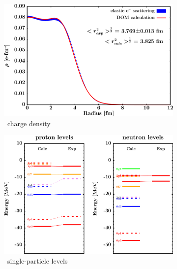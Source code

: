 \begin{figure}[hbtp]
    \captionsetup[subfigure]{labelformat=empty}
    \centering
    \begin{subfigure}[b]{0.45\textwidth}
        \centering
        \includegraphics[width=\linewidth]{figures/ni58_chargeDensity.png}
        \caption{\niEight\ charge density}
        \label{DOMFitData_ni58_chargeDensity}
    \end{subfigure}\hspace{6pt}
    \begin{subfigure}[b]{0.45\textwidth}
        \centering
        \includegraphics[width=\linewidth]{figures/ni58_SPLevels.png}
        \caption{\niEight\ single-particle levels}
        \label{DOMFitData_ni58_SPLevels}
    \end{subfigure}\vspace{0.3in}
    \begin{subfigure}[b]{0.45\textwidth}

\end{subfigure}
\end{figure}
